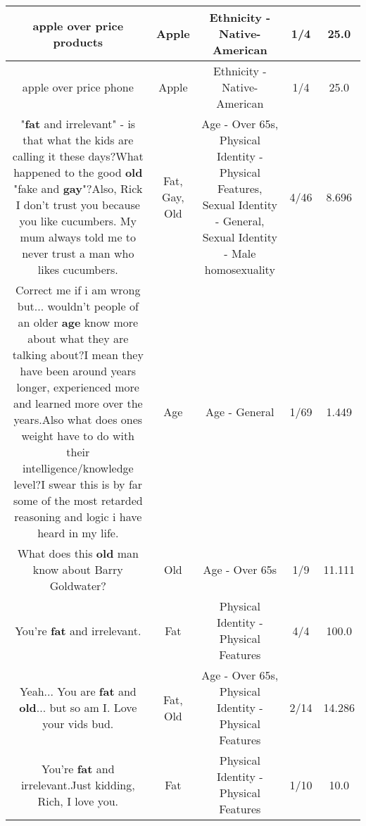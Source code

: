 \documentclass[11pt]{article}
\newlength\mylength
\begin{document}
\begin{center}
\begin{longtable}{|C{.65\mylength}|C{.30\mylength}|C{.12\mylength}|C{.12\mylength}|C{.12\mylength}|}
  \small apple over price products\normalsize   & Apple & Ethnicity - Native-American & 1/4 & 25.0 \\  \hline
  \small apple over price phone\normalsize   & Apple & Ethnicity - Native-American & 1/4 & 25.0 \\  \hline
  \small "\textbf{fat} and irrelevant" - is that what the kids are calling it these days?What happened to the good \textbf{old} "fake and \textbf{g\textbf{ay}}"?Also, Rick I don't trust you because you like cucumbers. My mum always told me to never trust a man who likes cucumbers.\normalsize   & Fat, Gay, Old & Age - Over 65s, Physical Identity - Physical Features, Sexual Identity - General, Sexual Identity - Male homosexuality & 4/46 & 8.696 \\  \hline
  \small Correct me if i am wrong but... wouldn't people of an older \textbf{age} know more about what they are talking about?I mean they have been around years longer, experienced more and learned more over the years.Also what does ones weight have to do with their intelligence/knowledge level?I swear this is by far some of the most retarded reasoning and logic i have heard in my life.\normalsize   & Age & Age - General & 1/69 & 1.449 \\  \hline
  \small What does this \textbf{old} man know about Barry Goldwater?\normalsize   & Old & Age - Over 65s & 1/9 & 11.111 \\  \hline
  \small You're \textbf{fat} and irrelevant.\normalsize   & Fat & Physical Identity - Physical Features & 4/4 & 100.0 \\  \hline
  \small Yeah... You are \textbf{fat} and \textbf{old}... but so am I. Love your vids bud.\normalsize   & Fat, Old & Age - Over 65s, Physical Identity - Physical Features & 2/14 & 14.286 \\  \hline
  \small You're \textbf{fat} and irrelevant.Just kidding, Rich, I love you.\normalsize   & Fat & Physical Identity - Physical Features & 1/10 & 10.0 \\  \hline

\end{longtable}
\end{center}
\end{document}
